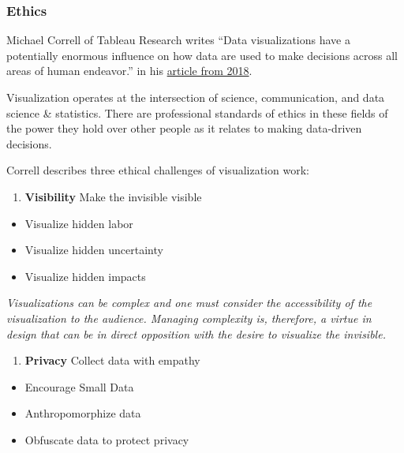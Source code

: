 \documentclass[
  letterpaper,
  DIV=11,
  numbers=noendperiod]{scrreprt}
\providecommand{\tightlist}{%
  \setlength{\itemsep}{0pt}\setlength{\parskip}{0pt}}\usepackage{longtable,booktabs,array}
\begin{document}
\subsubsection*{Ethics}\label{ethics}

Michael Correll of Tableau Research writes ``Data visualizations have a
potentially enormous influence on how data are used to make decisions
across all areas of human endeavor.'' in his
\href{https://arxiv.org/pdf/1811.07271.pdf}{article from 2018}.

Visualization operates at the intersection of science, communication,
and data science \& statistics. There are professional standards of
ethics in these fields of the power they hold over other people as it
relates to making data-driven decisions.

Correll describes three ethical challenges of visualization work:

\begin{enumerate}
\def\labelenumi{\arabic{enumi}.}
\tightlist
\item
  \textbf{Visibility} Make the invisible visible
\end{enumerate}

\begin{itemize}
\tightlist
\item
  Visualize hidden labor
\item
  Visualize hidden uncertainty
\item
  Visualize hidden impacts
\end{itemize}

\emph{Visualizations can be complex and one must consider the
accessibility of the visualization to the audience. Managing complexity
is, therefore, a virtue in design that can be in direct opposition with
the desire to visualize the invisible.}

\begin{enumerate}
\def\labelenumi{\arabic{enumi}.}
\setcounter{enumi}{1}
\tightlist
\item
  \textbf{Privacy} Collect data with empathy
\end{enumerate}

\begin{itemize}
\tightlist
\item
  Encourage Small Data
\item
  Anthropomorphize data
\item
  Obfuscate data to protect privacy
\end{itemize}
\end{document}
